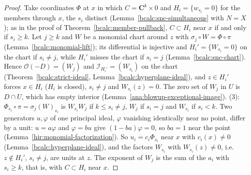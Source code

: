 \begin{proof}
\mixedleanok
Take coordinates \(\Phi\) at \(x\) in which \(C=\mathbf C^k\times0\) and \(H_i=\{w_{s_i}=0\}\) for the members through \(x\), the \(s_i\) distinct
(Lemma~\ref{bcalc:snc-simultaneous} with \(N=X\)); as in the proof of Theorem~\ref{bcalc:member-pullback}, \(C\subset H_i\) near \(x\) if and only if
\(s_i\ge k\). Let \(j\ge k\) and \(W\) be a monomial chart around \(z\) with \(\sigma_j\circ W=\Phi\circ\pi\) (Lemma~\ref{bcalc:monomial-lift}); its
differential is injective and \(H_i'=\{W_{s_i}=0\}\) on the chart if \(s_i\ne j\), while \(H_i'\) misses the chart if \(s_i=j\) (Lemma~\ref{bcalc:snc-chart}).
Hence \(\mathcal O(-D)=(W_j)\) and \(\mathcal I_{H_i'}=(W_{s_i})\) on the chart (Theorem~\ref{bcalc:strict-ideal}, Lemma~\ref{bcalc:hyperplane-ideal}), and
\(z\in H_i'\) forces \(x\in H_i\) (\(H_i\) is closed), \(s_i\ne j\) and \(W_{s_i}(z)=0\). The zero set of \(W_j\) in \(U\) is \(D\cap U\), which has empty
interior (Lemma~\ref{ana:blowup-exceptional-image}). (3): \(\Phi_{s_i}\circ\pi=\sigma_j(W)_{s_i}\) is \(W_{s_i}W_j\) if \(k\le s_i\ne j\), \(W_j\) if \(s_i=j\) and
\(W_{s_i}\) if \(s_i<k\). Two generators \(u,\varphi\) of one principal ideal, \(\varphi\) vanishing identically near no point, differ by a unit:
\(u=a\varphi\) and \(\varphi=bu\) give \((1-ba)\varphi=0\), so \(ba=1\) near the point (Lemma~\ref{hir:monomial-factorization}). So \(u_i=c_i\Phi_{s_i}\)
near \(x\) with \(c_i(x)\ne0\) (Lemma~\ref{bcalc:hyperplane-ideal}), and the factors \(W_{s_i}\) with \(W_{s_i}(z)\ne0\), i.e.\ \(z\notin H_i'\), \(s_i\ne j\), are units
at \(z\). The exponent of \(W_j\) is the sum of the \(a_i\) with \(s_i\ge k\), that is, with \(C\subset H_i\) near \(x\).
\end{proof}

